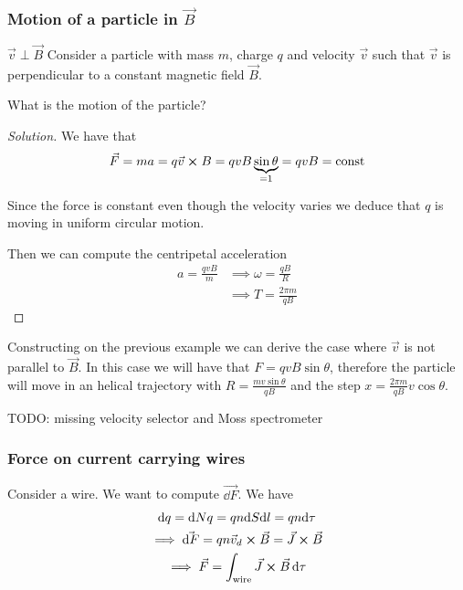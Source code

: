 \documentclass[12pt]{extarticle}
\begin{document}
\subsubsection{Motion of a particle in \texorpdfstring{$\vec B$}{B}}

\begin{example}{$\vec v \perp \vec B$}{}
    Consider a particle with mass $m$, charge $q$ and velocity $\vec v$
    such that $\vec v$ is perpendicular to a constant magnetic field $\vec B$.

    What is the motion of the particle?
\end{example}

\begin{proof}[Solution]
    We have that
    \begin{equation}
        \vec F = ma = q \vec v \cross B = q v B \underbrace{\sin \theta}_{= 1} = q v B = \text{const}
    \end{equation}

    Since the force is constant even though the velocity varies we deduce that $q$
    is moving in uniform circular motion.

    Then we can compute the centripetal acceleration
    \begin{align}
        a = \frac{q v B}{m} & \implies \omega = \frac{qB}{R}   \\
                            & \implies T = \frac{2 \pi m}{q B}
    \end{align}
\end{proof}

Constructing on the previous example we can derive the case where $\vec v$ is not parallel to $\vec B$.
In this case we will have that $F = qvB \sin \theta$,
therefore the particle will move in an helical trajectory with
$R = \frac{mv \sin \theta}{q B}$ and the step $x = \frac{2 \pi m}{q B} v \cos \theta$.

TODO: missing velocity selector and Moss spectrometer

\subsubsection{Force on current carrying wires}

Consider a wire. We want to compute $\vec{\dd F}$.
We have
\begin{gather}
    \dd q = \dd N q = q n \dd S \dd l = qn \dd \tau \\
    \implies \vec{\dd F} = q n \vec v_d \cross \vec B = \vec J \cross \vec B \\
    \implies \vec F = \int_\text{wire} \vec J \cross \vec B \dd{\tau}
\end{gather}
\end{document}
